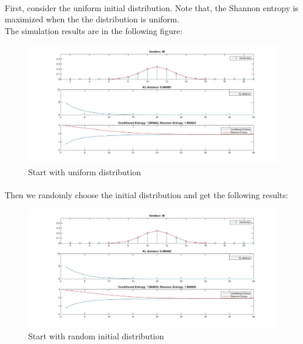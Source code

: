 \documentclass[a4paper, 11pt]{article} %
\begin{document}
\paragraph{}
First, consider the uniform initial distribution. Note that, the Shannon entropy is maximized when the the distribution is uniform.\\
\hspace*{2mm} The simulation results are in the following figure:
\begin{figure}[H]
\begin{center}
\includegraphics[scale=0.27]{uniform.jpg}
\end{center}
\caption{Start with uniform distribution}
\end{figure}

\paragraph{}
Then we randomly choose the initial distribution and get the following results:
\begin{figure}[H]
\begin{center}
\includegraphics[scale=0.27]{random.jpg}
\end{center}
\caption{Start with random initial distribution}
\end{figure}
\end{document}
